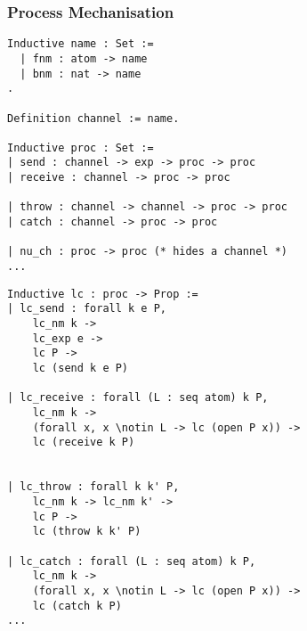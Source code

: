 \begin{frame}[fragile]
    \frametitle{Process Mechanisation}
\scriptsize
\begin{minipage}{0.4\textwidth}
\begin{sticky}
\vspace{-.5cm}
\begin{lstlisting}[language=Coq,basicstyle=\fontsize{6}{7}\selectfont]
Inductive name : Set :=
  | fnm : atom -> name
  | bnm : nat -> name
.

Definition channel := name.

Inductive proc : Set :=
| send : channel -> exp -> proc -> proc
| receive : channel -> proc -> proc

| throw : channel -> channel -> proc -> proc
| catch : channel -> proc -> proc

| nu_ch : proc -> proc (* hides a channel *)
...
\end{lstlisting}
\vspace{-.5cm}
\end{sticky}
\end{minipage}
\hspace{.5cm}
\begin{minipage}{0.55\textwidth}
\begin{sticky}
\vspace{-.5cm}
\begin{lstlisting}[language=Coq,basicstyle=\fontsize{6}{7}\selectfont]
Inductive lc : proc -> Prop :=
| lc_send : forall k e P,
    lc_nm k ->
    lc_exp e ->
    lc P ->
    lc (send k e P)

| lc_receive : forall (L : seq atom) k P,
    lc_nm k ->
    (forall x, x \notin L -> lc (open P x)) ->
    lc (receive k P)


| lc_throw : forall k k' P,
    lc_nm k -> lc_nm k' ->
    lc P ->
    lc (throw k k' P)

| lc_catch : forall (L : seq atom) k P,
    lc_nm k ->
    (forall x, x \notin L -> lc (open P x)) ->
    lc (catch k P)
...
\end{lstlisting}
\vspace{-.5cm}
\end{sticky}
\end{minipage}
\end{frame}

